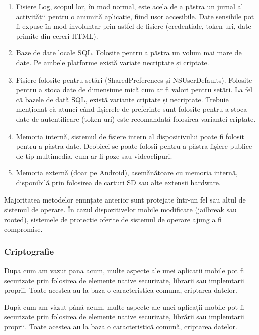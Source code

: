 \documentclass[12pt]{article}
\begin{document}
\begin{enumerate}
    \item Fișiere Log, scopul lor, în mod normal, este acela de a păstra
    un jurnal al activității pentru o anumită aplicație, fiind ușor
    accesibile. Date sensibile pot fi expuse în mod involuntar prin astfel de fișiere (credentiale, token-uri, 
    date primite din cereri HTML).
    \item Baze de date locale SQL. Folosite pentru a păstra
    un volum mai mare de date. Pe ambele platforme există variate necriptate și criptate.
    \item Fișiere folosite pentru setări (SharedPreferences și NSUserDefaults). Folosite
    pentru a stoca date de dimensiune mică cum ar fi valori pentru setări. La fel că 
    bazele de dată SQL, există variante criptate și necriptate. Trebuie menționat
    că atunci când fișierele de preferințe sunt folosite pentru a stoca date de autentificare (token-uri) 
    este recomandată folosirea variantei criptate.
    \item Memoria internă, sistemul de fișiere intern al dispositivului poate fi folosit
    pentru a păstra date. Deobicei se poate folosii pentru a păstra fișiere publice de tip 
    multimedia, cum ar fi poze sau videoclipuri.
    \item Memoria externă (doar pe Android), asemănătoare cu memoria internă, 
    disponibilă prin folosirea de carturi SD sau alte extensii hardware.
\end{enumerate}

Majoritatea metodelor enunțate anterior sunt protejate într-un fel sau altul
de sistemul de operare. În cazul dispozitivelor mobile modificate (jailbreak sau rooted), 
sistemele de protecție oferite de sistemul de operare ajung a fi compromise.

\subsubsection{Criptografie}

Dupa cum am vazut pana acum, multe aspecte ale unei aplicatii mobile pot fi securizate
prin folosirea de elemente native securizate, librarii sau implemtarii proprii. Toate acestea
au la baza o caracteristica comuna, criptarea datelor.

\bigskip

După cum am văzut până acum, multe aspecte ale unei aplicații mobile pot fi securizate
prin folosirea de elemente native securizate, librării sau implemtarii proprii. Toate acestea
au la baza o caracteristică comună, criptarea datelor.
\end{document}
